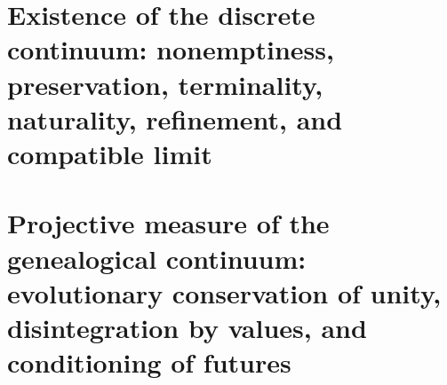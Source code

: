 

\chapter{Existence of the discrete continuum: nonemptiness, preservation, terminality, naturality, refinement, and compatible limit}
\label{chap:sucesor-102-06}
\label{owner:sucesor-102-04b3-unico}
















\chapter{Projective measure of the genealogical continuum: evolutionary conservation of unity, disintegration by values, and conditioning of futures}
\label{chap:sucesor-102-07}



